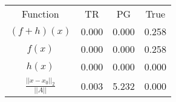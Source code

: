 \begin{tabular}{| c |c |c |c |}
    \hline
    \rowcolor[gray]{0.9}
\multicolumn{4}{|c|}{Minima} \\ \hline Function & TR & PG & True \\
    \hline
  \rowcolor[gray]{0.7}
    $ (f + h)(x) $ & 0.000 & 0.000 & 0.258 \\
  \hline
  \rowcolor[gray]{0.8}
    $ f(x) $ & 0.000 & 0.000 & 0.258 \\
  \hline
  \rowcolor[gray]{0.7}
    $ h(x) $ & 0.000 & 0.000 & 0.000 \\
  \hline
  \rowcolor[gray]{0.8}
    $ \frac{||x - x_0||_2}{||A||} $ & 0.003 & 5.232 & 0.000 \\
  \hline
\end{tabular}
